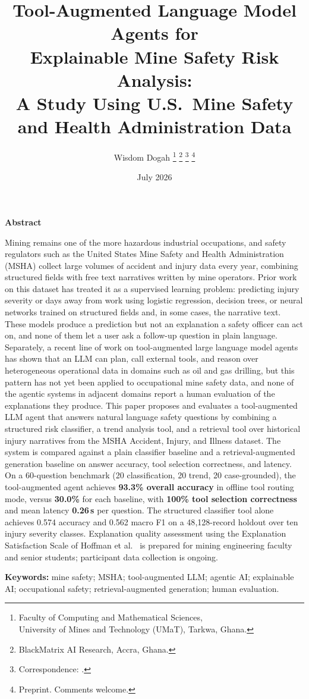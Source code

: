 \documentclass[11pt,a4paper]{article}
\title{%
  \textbf{Tool-Augmented Language Model Agents for}\\[0.35em]
  \textbf{Explainable Mine Safety Risk Analysis:}\\[0.35em]
  \textbf{A Study Using U.S.\ Mine Safety and Health Administration Data}%
}
\author{%
  Wisdom Dogah%
  \thanks{\footnotesize Faculty of Computing and Mathematical Sciences,\\ University of Mines and Technology (UMaT), Tarkwa, Ghana.}%
  \thanks{\footnotesize BlackMatrix AI Research, Accra, Ghana.}%
  \thanks{\footnotesize Correspondence: \email{wisdom@blackmatrix.io}.}%
  \thanks{\footnotesize Preprint. Comments welcome.}%
}
\date{July 2026}
\renewcommand{\abstractname}{Abstract}
\renewenvironment{abstract}{%
  \centerline{\textbf{\abstractname}}\par\vspace{0.5em}%
  \small\justifying
}{%
  \par\vspace{0.6em}%
}
\begin{document}
\maketitle
\thispagestyle{plain}
\justifying

\begin{abstract}
Mining remains one of the more hazardous industrial occupations, and
safety regulators such as the United States Mine Safety and Health
Administration (MSHA) collect large volumes of accident and injury
data every year, combining structured fields with free text narratives
written by mine operators. Prior work on this dataset has treated it as
a supervised learning problem: predicting injury severity or days away
from work using logistic regression, decision trees, or neural networks
trained on structured fields and, in some cases, the narrative text.
These models produce a prediction but not an explanation a safety
officer can act on, and none of them let a user ask a follow-up question
in plain language. Separately, a recent line of work on tool-augmented
large language model agents has shown that an LLM can plan, call
external tools, and reason over heterogeneous operational data in
domains such as oil and gas drilling, but this pattern has not yet been
applied to occupational mine safety data, and none of the agentic systems
in adjacent domains report a human evaluation of the explanations they
produce. This paper proposes and evaluates a tool-augmented LLM agent
that answers natural language safety questions by combining a structured
risk classifier, a trend analysis tool, and a retrieval tool over
historical injury narratives from the MSHA Accident, Injury, and Illness
dataset. The system is compared against a plain classifier baseline and
a retrieval-augmented generation baseline on answer accuracy, tool
selection correctness, and latency. On a 60-question benchmark (20
classification, 20 trend, 20 case-grounded), the tool-augmented agent
achieves \textbf{93.3\% overall accuracy} in offline tool routing mode,
versus \textbf{30.0\%} for each baseline, with \textbf{100\% tool
selection correctness} and mean latency \textbf{0.26\,s} per question.
The structured classifier tool alone achieves 0.574 accuracy and 0.562
macro F1 on a 48{,}128-record holdout over ten injury severity classes.
Explanation quality assessment using the Explanation Satisfaction Scale
of Hoffman et al.~\cite{Hoffman2023} is prepared for mining
engineering faculty and senior students; participant data collection
is ongoing.

\noindent\textbf{Keywords:}
mine safety;
MSHA;
tool-augmented LLM;
agentic AI;
explainable AI;
occupational safety;
retrieval-augmented generation;
human evaluation.
\end{abstract}
\end{document}
